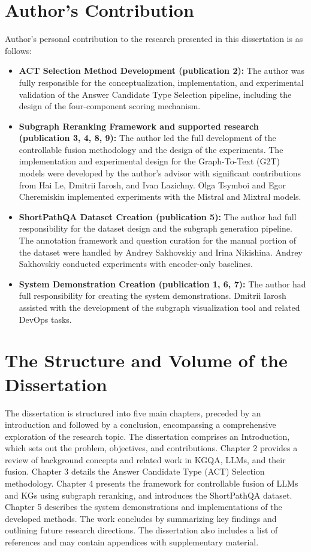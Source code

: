 \section*{Author's Contribution}
\label{sec:synopsis:contribution}
Author's personal contribution to the research presented in this dissertation is as follows:
\begin{itemize}
    \item \textbf{ACT Selection Method Development (publication 2):} The author was fully responsible for the conceptualization, implementation, and experimental validation of the Answer Candidate Type Selection pipeline, including the design of the four-component scoring mechanism.
    \item \textbf{Subgraph Reranking Framework and supported research (publication 3, 4, 8, 9):} The author led the full development of the controllable fusion methodology and the design of the experiments. The implementation and experimental design for the Graph-To-Text (G2T) models were developed by the author's advisor with significant contributions from Hai Le, Dmitrii Iarosh, and Ivan Lazichny. Olga Tsymboi and Egor Cheremiskin implemented experiments with the Mistral and Mixtral models.
    \item \textbf{ShortPathQA Dataset Creation (publication 5):} The author had full responsibility for the dataset design and the subgraph generation pipeline. The annotation framework and question curation for the manual portion of the dataset were handled by Andrey Sakhovskiy and Irina Nikishina. Andrey Sakhovskiy conducted experiments with encoder-only baselines.
    \item \textbf{System Demonstration Creation (publication 1, 6, 7):} The author had full responsibility for creating the system demonstrations. Dmitrii Iarosh assisted with the development of the subgraph visualization tool and related DevOps tasks.
\end{itemize}

\section*{The Structure and Volume of the Dissertation}
\label{sec:synopsis:structure}
The dissertation is structured into five main chapters, preceded by an introduction and followed by a conclusion, encompassing a comprehensive exploration of the research topic.
The dissertation comprises an Introduction, which sets out the problem, objectives, and contributions. Chapter 2 provides a review of background concepts and related work in KGQA, LLMs, and their fusion. Chapter 3 details the Answer Candidate Type (ACT) Selection methodology. Chapter 4 presents the framework for controllable fusion of LLMs and KGs using subgraph reranking, and introduces the ShortPathQA dataset. Chapter 5 describes the system demonstrations and implementations of the developed methods. The work concludes by summarizing key findings and outlining future research directions. The dissertation also includes a list of references and may contain appendices with supplementary material.

